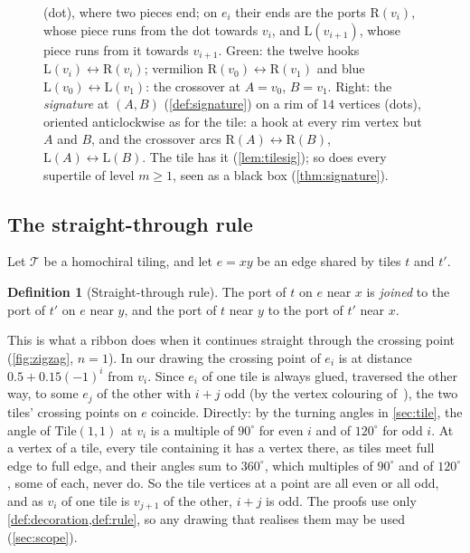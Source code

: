 \documentclass[11pt]{amsart}
\theoremstyle{definition}
\newtheorem{definition}[theorem]{Definition}
\theoremstyle{remark}
\newcommand{\Tile}{\mathrm{Tile}(1,1)}
\newcommand{\T}{\mathcal T}
\newcommand{\Lp}{\mathrm L}
\newcommand{\Rp}{\mathrm R}
\begin{document}
\begin{figure}[t]
{(dot), where two pieces end; on $e_i$ their ends are the ports $\Rp(v_i)$, whose piece runs from the dot towards $v_i$, and
$\Lp(v_{i+1})$, whose piece runs from it towards $v_{i+1}$. Green: the twelve hooks $\Lp(v_i)\leftrightarrow\Rp(v_i)$; vermilion
$\Rp(v_0)\leftrightarrow\Rp(v_1)$ and blue $\Lp(v_0)\leftrightarrow\Lp(v_1)$: the crossover at $A=v_0$, $B=v_1$. Right:
the \emph{signature} at $(A,B)$ (\cref{def:signature}) on a rim of $14$ vertices (dots), oriented anticlockwise as
for the tile: a hook at every rim vertex but $A$ and $B$, and the crossover arcs $\Rp(A)\leftrightarrow\Rp(B)$,
$\Lp(A)\leftrightarrow\Lp(B)$. The tile has it (\cref{lem:tilesig}); so does every supertile of level $m\ge1$, seen as a
black box (\cref{thm:signature}).}
\label{fig:tileports}\label{fig:signature}
\end{figure}

\subsection{The straight-through rule}
Let $\T$ be a homochiral tiling, and let $e=xy$ be an edge shared by tiles $t$ and $t'$.

\begin{definition}[Straight-through rule]\label{def:rule}
The port of $t$ on $e$ near $x$ is \emph{joined} to the port of $t'$ on $e$ near $y$, and the port of $t$ near $y$ to
the port of $t'$ near $x$.
\end{definition}

This is what a ribbon does when it continues straight through the crossing point (\cref{fig:zigzag}, $n=1$). In our
drawing the crossing point of $e_i$ is at distance $0.5+0.15(-1)^i$ from $v_i$. Since $e_i$ of one tile is always
glued, traversed the other way, to some $e_j$ of the other with $i+j$ odd (by the vertex colouring of~\cite[proof of
Lemma~2.1]{SMKGS-spectre}), the two tiles' crossing points on $e$ coincide. Directly: by the turning angles in \cref{sec:tile},
the angle of $\Tile$ at $v_i$ is a multiple of $90^\circ$ for even $i$ and of $120^\circ$ for odd $i$. At a vertex of a
tile, every tile containing it has a vertex there, as tiles meet full edge to full edge, and their angles sum to
$360^\circ$, which multiples of $90^\circ$ and of $120^\circ$, some of each, never do. So the tile vertices at a point
are all even or all odd, and as $v_i$ of one tile is $v_{j+1}$ of the other, $i+j$ is odd. The proofs use only
\cref{def:decoration,def:rule}, so any drawing that realises them may be used (\cref{sec:scope}).
\end{document}
